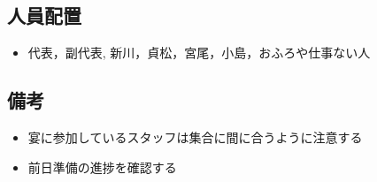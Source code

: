 \subsection{人員配置}
\begin{itemize}
\item 代表，副代表, 新川，貞松，宮尾，小島，おふろや仕事ない人
\end{itemize}

\subsection{備考}
\begin{itemize}
  \item 宴に参加しているスタッフは集合に間に合うように注意する
  \item 前日準備の進捗を確認する
\end{itemize}

%

